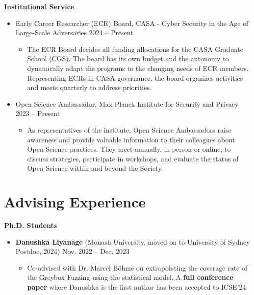 \documentclass[letterpaper,11pt]{article}
\begin{document}
\textbf{Institutional Service}\vspace{-4pt}
\begin{itemize}
  \item Early Career Researcher (ECR) Board, CASA - Cyber Security in the Age of Large-Scale Adversaries \hfill 2024 -- Present
  \begin{itemize}[leftmargin=.5cm]
    \item[] The ECR Board decides all funding allocations for the CASA Graduate School (CGS). The board has its own budget and the autonomy to dynamically adapt the programs to the changing needs of ECR members. Representing ECRs in CASA governance, the board organizes activities and meets quarterly to address priorities.
  \end{itemize}
  \item Open Science Ambassador, Max Planck Institute for Security and Privacy \hfill   2023 -- Present  \vspace{-6pt}
  \begin{itemize}[leftmargin=.5cm]
    \item[] As representatives of the institute, Open Science Ambassadors raise awareness and provide valuable information to their colleagues about Open Science practices. They meet annually, in person or online, to discuss strategies, participate in workshops, and evaluate the status of Open Science within and beyond the Society.
  \end{itemize}
\end{itemize}


\section{Advising Experience}
\textbf{Ph.D. Students}\vspace{-4pt}
\begin{itemize}
  \item \textbf{Danushka Liyanage} (Monash University, moved on to University of Sydney Postdoc, 2024) \hfill Nov. 2022 -- Dec. 2023 \vspace{-6pt}
  \begin{itemize}[leftmargin=.5cm]
    \item[] Co-advised with Dr. Marcel Böhme on extrapolating the coverage rate of the Greybox Fuzzing using the statistical model. A \textbf{full conference paper} where Danushka is the first author has been accepted to ICSE'24.
  \end{itemize}
\end{itemize}
\end{document}
